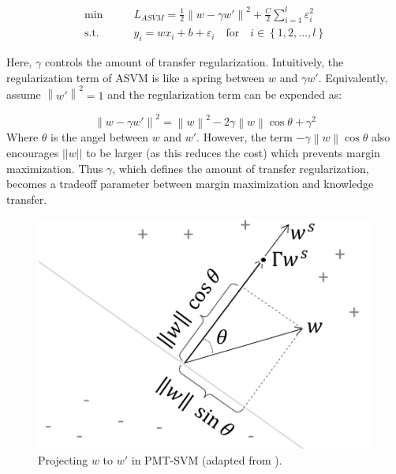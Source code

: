 \begin{equation}\label{eq:gama:asvm}
\begin{aligned}
\min \qquad& L_{ASVM} = \frac{1}{2}{\left\| w - \gamma w' \right\|^2} + \frac{C}{2}\sum\limits_{i = 1}^l {{\varepsilon_i ^2}}\\
\text{s.t.}\qquad&{y_i} = w{x_i} + b + {\varepsilon _i} \quad   \text{for} \quad i \in \left\{ {1,2,...,l} \right\}
\end{aligned}
\end{equation}

Here, $\gamma$ controls the amount of transfer regularization. Intuitively, the regularization term of ASVM is like a spring between $w$ and $\gamma w'$. Equivalently, assume ${\left\| {w'} \right\|^2}=1$ and the regularization term can be expended as:

\begin{equation*}
{\left\| {w - \gamma w'} \right\|^2} = {\left\| w \right\|^2} - 2\gamma \left\| w \right\|\cos \theta  + {\gamma ^2}
\end{equation*}
Where $\theta$ is the angel between $w$ and $w'$. However, the term $-\gamma \left\| w \right\|\cos \theta$ also encourages $||w||$
to be larger (as this reduces the cost) which prevents margin maximization. Thus $\gamma$, which defines the amount of transfer regularization, becomes a tradeoff parameter between margin maximization and knowledge transfer.

\begin{figure}
\centering
\includegraphics[scale=.6]{transfer/fig/pmt-svm.png}
\caption{Projecting $w$ to $w'$ in PMT-SVM (adapted from \cite{aytar2011tabula}).}\label{fig:gama:pmt}
\end{figure}

